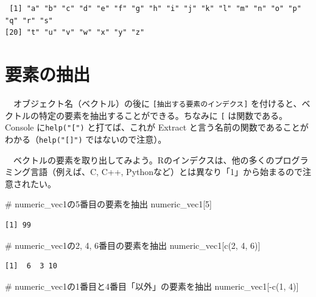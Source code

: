 \documentclass[
  a4paper,
  pandoc,
  ja=standard,
  jafont=haranoaji]{bxjsbook}
\newenvironment{Shaded}{\begin{snugshade}}{\end{snugshade}}
\newcommand{\CommentTok}[1]{\textcolor[rgb]{0.37,0.37,0.37}{#1}}
\newcommand{\DecValTok}[1]{\textcolor[rgb]{0.68,0.00,0.00}{#1}}
\newcommand{\FunctionTok}[1]{\textcolor[rgb]{0.28,0.35,0.67}{#1}}
\newcommand{\NormalTok}[1]{\textcolor[rgb]{0.00,0.48,0.65}{#1}}
\newcommand{\SpecialCharTok}[1]{\textcolor[rgb]{0.37,0.37,0.37}{#1}}
\begin{document}
\begin{verbatim}
 [1] "a" "b" "c" "d" "e" "f" "g" "h" "i" "j" "k" "l" "m" "n" "o" "p" "q" "r" "s"
[20] "t" "u" "v" "w" "x" "y" "z"
\end{verbatim}

\hypertarget{sec-rbasic_extract}{%
\section{要素の抽出}\label{sec-rbasic_extract}}

　オブジェクト名（ベクトル）の後に
\texttt{{[}抽出する要素のインデクス{]}}
を付けると、ベクトルの特定の要素を抽出することができる。ちなみに
\texttt{{[}} は関数である。Console に\texttt{help("{[}")}
と打てば、これが Extract
と言う名前の関数であることがわかる（\texttt{help("{[}{]}")}
ではないので注意）。

　ベクトルの要素を取り出してみよう。Rのインデクスは、他の多くのプログラミング言語（例えば、C,
C++, Pythonなど）とは異なり「1」から始まるので注意されたい。

\begin{Shaded}
\begin{Highlighting}[numbers=left,,]
\CommentTok{\# numeric\_vec1の5番目の要素を抽出}
\NormalTok{numeric\_vec1[}\DecValTok{5}\NormalTok{]}
\end{Highlighting}
\end{Shaded}

\begin{verbatim}
[1] 99
\end{verbatim}

\begin{Shaded}
\begin{Highlighting}[numbers=left,,]
\CommentTok{\# numeric\_vec1の2, 4, 6番目の要素を抽出}
\NormalTok{numeric\_vec1[}\FunctionTok{c}\NormalTok{(}\DecValTok{2}\NormalTok{, }\DecValTok{4}\NormalTok{, }\DecValTok{6}\NormalTok{)]}
\end{Highlighting}
\end{Shaded}

\begin{verbatim}
[1]  6  3 10
\end{verbatim}

\begin{Shaded}
\begin{Highlighting}[numbers=left,,]
\CommentTok{\# numeric\_vec1の1番目と4番目「以外」の要素を抽出}
\NormalTok{numeric\_vec1[}\SpecialCharTok{{-}}\FunctionTok{c}\NormalTok{(}\DecValTok{1}\NormalTok{, }\DecValTok{4}\NormalTok{)]}
\end{Highlighting}
\end{Shaded}
\end{document}
